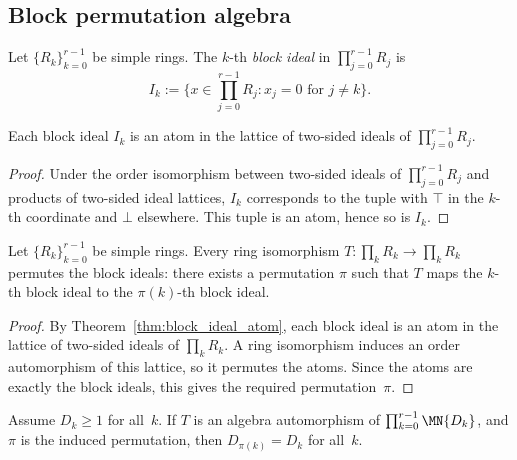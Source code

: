 \subsection{Block permutation algebra}

\begin{definition}\label{def:block_ideal}
    \leanok
    Let $\{R_k\}_{k=0}^{r-1}$ be simple rings.
    The $k$-th \emph{block ideal} in $\prod_{j=0}^{r-1} R_j$ is
    \[
        I_k := \{x \in \prod_{j=0}^{r-1} R_j : x_j = 0 \text{ for } j \neq k\}.
    \]
\end{definition}

\begin{theorem}\label{thm:block_ideal_atom}
    \leanok
    Each block ideal $I_k$ is an atom in the lattice of two-sided ideals of
    $\prod_{j=0}^{r-1} R_j$.
\end{theorem}

\begin{proof}
    \leanok
    Under the order isomorphism between two-sided ideals of
    $\prod_{j=0}^{r-1} R_j$
    and products of two-sided ideal lattices, $I_k$ corresponds to the tuple with
    $\top$ in the $k$-th coordinate and $\bot$ elsewhere. This tuple is an atom,
    hence so is $I_k$.
\end{proof}

\begin{theorem}\label{thm:ring_perm}
    \leanok
    Let $\{R_k\}_{k=0}^{r-1}$ be simple rings.
    Every ring isomorphism $T : \prod_k R_k \to \prod_k R_k$
    permutes the block ideals:
    there exists a permutation $\pi$ such that
    $T$ maps the $k$-th block ideal to the $\pi(k)$-th block ideal.
\end{theorem}

\begin{proof}
    \leanok
    By Theorem~\ref{thm:block_ideal_atom}, each block ideal is an atom in the
    lattice of two-sided ideals of $\prod_k R_k$.
    A ring isomorphism induces an order automorphism of this lattice,
    so it permutes the atoms. Since the atoms are exactly the block ideals,
    this gives the required permutation~$\pi$.
\end{proof}

\begin{theorem}\label{thm:dim_preserved}
    \leanok
    Assume $D_k \ge 1$ for all~$k$.
    If $T$ is an algebra automorphism of
    $\prod_{k=0}^{r-1} \MN{D_k}$,
    and $\pi$ is the induced permutation, then
    $D_{\pi(k)} = D_k$ for all~$k$.
\end{theorem}

